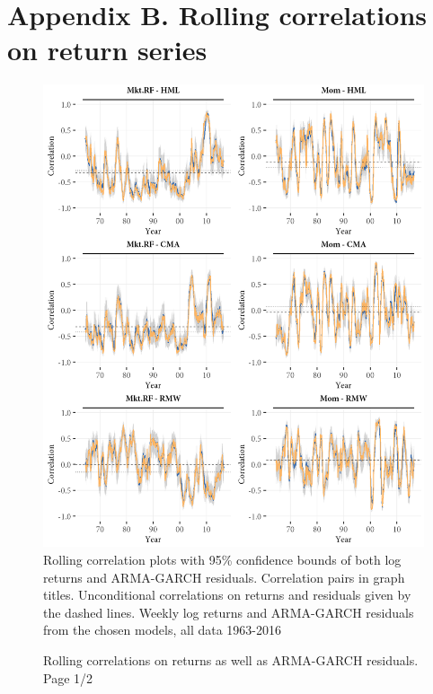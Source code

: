 \section{Appendix B. Rolling correlations on return series}
\label{app:rolling_return}
\begin{figure}[H]
  \caption{Rolling correlations on returns as well as ARMA-GARCH residuals. Page 1/2}
  \label{fig:appendix_rolling1}
  \centering
  \begin{minipage}{\textwidth}
  \includegraphics[scale=1]{graphics/appendix_rolling1.png}  
  \vspace{3mm}
  \footnotesize
  Rolling correlation plots with 95\% confidence bounds of both log returns and ARMA-GARCH residuals. Correlation pairs in graph titles. Unconditional correlations on returns and residuals given by the dashed lines. Weekly log returns and ARMA-GARCH residuals from the chosen models, all data 1963-2016
  \end{minipage}
\end{figure}
